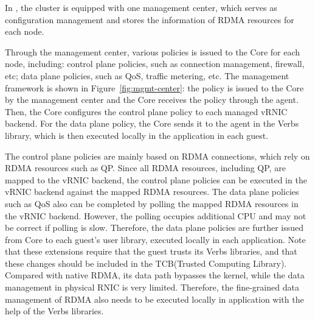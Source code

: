 In \sys, the cluster is equipped with one management center, which serves as configuration management and stores the information of RDMA resources for each node.


Through the management center, various policies is issued to the \sys Core for each node, including: control plane policies, such as connection management, firewall, etc; data plane policies, such as QoS, traffic metering, etc. The management framework is shown in Figure~\ref{fig:mgmt-center}: the policy is issued to the \sys Core by the management center and the \sys Core receives the policy through the agent. Then, the \sys Core configures the control plane policy to each managed vRNIC backend. For the data plane policy, the \sys Core sends it to the agent in the Verbs library, which is then executed locally in the application in each guest.


The control plane policies are mainly based on RDMA connections, which rely on RDMA resources such as QP. Since all RDMA resources, including QP, are mapped to the vRNIC backend, the control plane policies can be executed in the vRNIC backend against the mapped RDMA resources. The data plane policies such as QoS also can be completed by polling the mapped RDMA resources in the vRNIC backend. However, the polling occupies additional CPU and may not be correct if polling is slow. Therefore, the data plane policies are further issued from \sys Core to each guest's user library, executed locally in each application. Note that these extensions require that the guest trusts its Verbs libraries, and that these changes should be included in the TCB(Trusted Computing Library). Compared with native RDMA, its data path bypasses the kernel, while the data management in physical RNIC is very limited. Therefore, the fine-grained data management of RDMA also needs to be executed locally in application with the help of the Verbs libraries.

